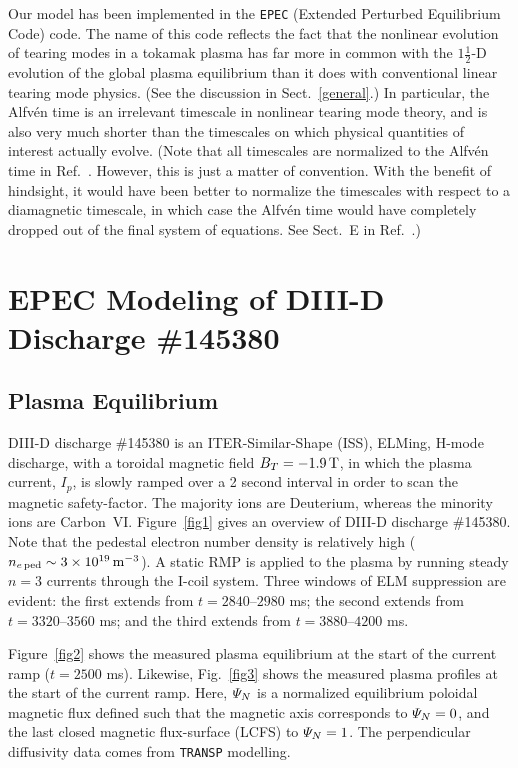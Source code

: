 \documentclass[12pt,prb,aps]{revtex4-1}
\begin{document}
Our model has been implemented in the {\tt EPEC} (Extended Perturbed Equilibrium Code) code. The name
of this code reflects the fact that the nonlinear evolution of tearing modes in a
tokamak plasma has far more in common with the $1\tfrac{1}{2}$-D
evolution of the global plasma equilibrium than it does with
conventional linear tearing mode physics. (See the discussion in Sect.~\ref{general}.) In particular, the Alfv\'{e}n time is
an irrelevant timescale in nonlinear tearing mode theory, and
is also  very much shorter than the timescales on which
physical quantities of interest actually evolve. (Note that all timescales are normalized to the Alfv\'{e}n time
in Ref.~. However, this is just a matter of convention. With the benefit of hindsight, it would
have been better to normalize the timescales with respect to a diamagnetic timescale, in which case the Alfv\'{e}n time would have completely dropped
out of the final system of equations. See Sect.~E in Ref.~.)

\section{EPEC Modeling of DIII-D Discharge \#145380}
\subsection{Plasma Equilibrium}
DIII-D discharge \#145380 is an ITER-Similar-Shape (ISS), ELMing, H-mode discharge, with a toroidal magnetic field $B_T=-1.9\,{\rm T}$, in which the
plasma current, $I_p$, is slowly ramped over a 2 second interval in order to scan the magnetic safety-factor.\cite{d3d,d3d2} The majority ions are Deuterium, whereas the
minority ions are Carbon~VI.
Figure~\ref{fig1} gives an overview of DIII-D discharge \#145380. Note that the pedestal electron number density is relatively high ($n_{e\,{\rm ped}}\sim 3\times 10^{19}\,{\rm m}^{-3}$). 
A static RMP is applied to the plasma by running steady $n=3$ currents through the I-coil system.\cite{icoil}
Three windows of ELM suppression are evident: the first extends from $t=2840$--$2980$ ms; the
second extends from $t=3320$--$3560$ ms; and the third extends from $t=3880$--$4200$ ms.

Figure~\ref{fig2} shows the measured plasma equilibrium at the start of the current ramp ($t=2500$ ms). Likewise,
Fig.~\ref{fig3} shows the measured plasma profiles at the start of the current ramp. Here, ${\mit\Psi}_N$ is a
normalized equilibrium poloidal magnetic flux defined such that the magnetic axis corresponds to ${\mit\Psi}_N=0$, 
and the last closed magnetic flux-surface (LCFS) to ${\mit\Psi}_N=1$. The perpendicular
diffusivity data comes from {\tt TRANSP} modelling.\cite{transp}  
\end{document}

